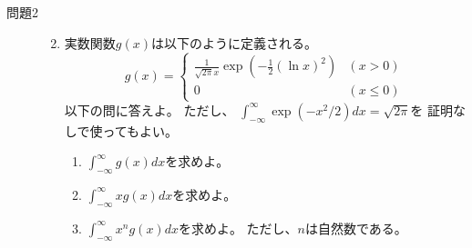 \documentclass[12pt,b5paper]{ltjsarticle}
\begin{document}
\begin{description}
       \hrulefill

 \item[問題2]

       \begin{enumerate}
%
%

        \setcounter{enumi}{1}
        \item
             実数関数$g(x)$は以下のように定義される。
             \begin{equation}
              g(x)=
               \begin{cases}
                \frac{1}{\sqrt{2\pi}x}\exp{\left(-\frac{1}{2}(\ln{x})^{2}\right)} & (x>0)\\
                0 & (x\leq 0)
               \end{cases}
             \end{equation}
             以下の問に答えよ。
             ただし、
             $\int_{-\infty}^{\infty} \exp{(-x^{2}/2)}dx = \sqrt{2\pi}$を
             証明なしで使ってもよい。
             \begin{enumerate}
              \item
                   $\int_{-\infty}^{\infty} g(x) dx$を求めよ。

              \item
                   $\int_{-\infty}^{\infty} xg(x) dx$を求めよ。

              \item
                   $\int_{-\infty}^{\infty} x^{n}g(x) dx$を求めよ。
                   ただし、$n$は自然数である。
             \end{enumerate}




\end{enumerate}
\end{description}
\end{document}
